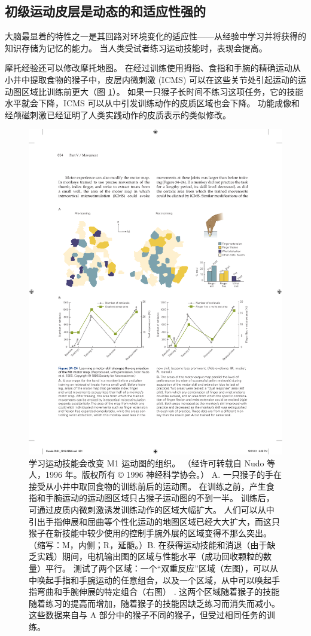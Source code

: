 \subsection{初级运动皮层是动态的和适应性强的}
大脑最显着的特性之一是其回路对环境变化的适应性——从经验中学习并将获得的知识存储为记忆的能力。 当人类受试者练习运动技能时，表现会提高。

摩托经验还可以修改摩托地图。 
在经过训练使用拇指、食指和手腕的精确运动从小井中提取食物的猴子中，皮层内微刺激 (ICMS) 可以在这些关节处引起运动的运动图区域比训练前更大（图 \ref{fig:34_24}）。 
如果一只猴子长时间不练习这项任务，它的技能水平就会下降，ICMS 可以从中引发训练动作的皮质区域也会下降。 功能成像和经颅磁刺激已经证明了人类实践动作的皮质表示的类似修改。

\begin{figure}[htbp]
	\centering
	\includegraphics[width=0.9\linewidth]{chap34/fig_34_24}
	\caption{学习运动技能会改变 M1 运动图的组织。 （经许可转载自 Nudo 等人，1996 年。版权所有 © 1996 神经科学协会。） A. 一只猴子的手在接受从小井中取回食物的训练前后的运动图。 在训练之前，产生食指和手腕运动的运动图区域只占猴子运动图的不到一半。 训练后，可通过皮质内微刺激诱发训练动作的区域大幅扩大。 人们可以从中引出手指伸展和屈曲等个性化运动的地图区域已经大大扩大，而这只猴子在新技能中较少使用的控制手腕外展的区域变得不那么突出。 （缩写：M，内侧；R，延髓。）B. 在获得运动技能和消退（由于缺乏实践）期间，电机输出图的区域与性能水平（成功回收颗粒的数量）平行。 测试了两个区域：一个“双重反应”区域（左图），可以从中唤起手指和手腕运动的任意组合，以及一个区域，从中可以唤起手指弯曲和手腕伸展的特定组合（右图） . 这两个区域随着猴子的技能随着练习的提高而增加，随着猴子的技能因缺乏练习而消失而减小。 这些数据来自与 A 部分中的猴子不同的猴子，但受过相同任务的训练。}
	\label{fig:34_24}
\end{figure}

